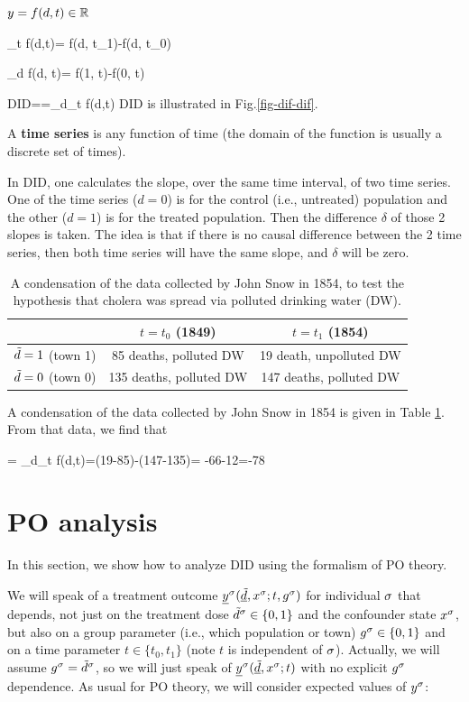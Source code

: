 $y=f(d,t)\in { \mathbb{R}}$

\beq
\Delta_t f(d,t)= f(d, t_1)-f(d, t_0)
\eeq

\beq
\Delta_d f(d, t)= f(1, t)-f(0, t)
\eeq

\beq
DID=\delta=\Delta_d\Delta_t f(d,t)
\eeq
DID is illustrated in
 Fig.\ref{fig-dif-dif}. 


A {\bf time series} 
is  any function of time
(the domain of the function
is usually a discrete set of times).


In DID, one calculates the slope,
over the same
time interval,
of two time series. One
of the time series ($d=0$)
is for
the control (i.e., untreated) population
and the other ($d=1$) is
 for the treated population.
Then the 
difference $\delta$ of those 2 slopes is taken.
The idea is that if there is no causal difference
between the 2 time series,
then both time
series will 
have the same slope, and
$\delta$ will be zero.


\begin{table}[h!]
\centering
{\renewcommand{\arraystretch}{1.4}
\begin{tabular}{|c|c|c|}
\hline 
\rowcolor[HTML]{ECF4FF} 
 & $t=t_0 $ (1849) & $t=t_1$ (1854) \\ 
\hline
${\tilde{d}}=1 $ (town 1)\cellcolor[HTML]{ECF4FF}
&85 deaths, polluted DW&19 death, unpolluted DW\\
\hline 
${\tilde{d}}=0 $ (town 0)\cellcolor[HTML]{ECF4FF} 
&135 deaths, polluted DW& 147 deaths, polluted DW\\ 
\end{tabular}
}
\caption{A condensation of the data
collected by 
John Snow in 1854,
to test the hypothesis
that cholera was spread via
polluted drinking water (DW).}
\label{tab-john-snow}
\end{table}

A condensation of the
data collected by John Snow in 1854
is given in Table \ref{tab-john-snow}.
From that data, we find that

\beq
\delta= \Delta_d\Delta_t f(d,t)=(19-85)-(147-135)=
-66-12=-78
\eeq



\section{PO analysis}
In this section,
we show how
to analyze
DID 
using the formalism of PO theory.

We will speak of a treatment 
outcome
${\underline{y}}^\sigma({\underline{\tilde{d}}}, x^\sigma; t, g^\sigma)$
for individual $\sigma$
that depends, not 
just on the treatment dose ${\tilde{d}}^\sigma\in \{0,1\}$
and the confounder state $x^\sigma$,
but also
on a group parameter (i.e., which population
or town)
$g^\sigma\in \{0,1\}$
and on a time parameter $t\in\{t_0, t_1\}$ 
(note $t$ is independent of $\sigma$).
Actually,
we will assume $g^\sigma={\tilde{d}}^\sigma$,
so we will just speak of
${\underline{y}}^\sigma({\underline{\tilde{d}}}, x^\sigma; t)$
with no explicit $g^\sigma$
dependence. As usual for PO theory,
we will consider
expected values of $y^\sigma$:


